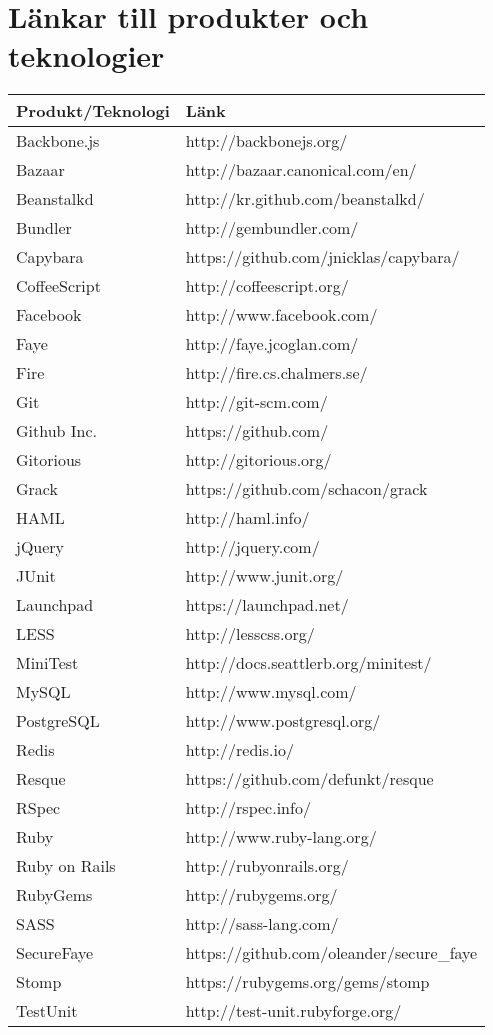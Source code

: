 \section{Länkar till produkter och teknologier}
\small
\begin{tabular} { | l | l | }
\hline
\bf{Produkt/Teknologi} & \bf{Länk} \\
\hline
Backbone.js & http://backbonejs.org/ \\
\hline
Bazaar & http://bazaar.canonical.com/en/ \\
\hline
Beanstalkd & http://kr.github.com/beanstalkd/ \\
\hline
Bundler & http://gembundler.com/ \\
\hline
Capybara & https://github.com/jnicklas/capybara/ \\
\hline 
CoffeeScript & http://coffeescript.org/ \\
\hline
Facebook & http://www.facebook.com/ \\
\hline
Faye & http://faye.jcoglan.com/ \\
\hline
Fire & http://fire.cs.chalmers.se/ \\
\hline
Git & http://git-scm.com/ \\
\hline
Github Inc. & https://github.com/ \\
\hline
Gitorious & http://gitorious.org/ \\
\hline
Grack & https://github.com/schacon/grack \\
\hline
HAML & http://haml.info/ \\
\hline
jQuery & http://jquery.com/ \\
\hline
JUnit & http://www.junit.org/ \\
\hline
Launchpad & https://launchpad.net/ \\
\hline
LESS & http://lesscss.org/ \\
\hline
MiniTest & http://docs.seattlerb.org/minitest/ \\
\hline
MySQL & http://www.mysql.com/ \\
\hline
PostgreSQL & http://www.postgresql.org/ \\
\hline
Redis & http://redis.io/ \\
\hline
Resque & https://github.com/defunkt/resque \\
\hline
RSpec & http://rspec.info/ \\
\hline
Ruby & http://www.ruby-lang.org/ \\
\hline
Ruby on Rails & http://rubyonrails.org/ \\
\hline
RubyGems & http://rubygems.org/ \\
\hline
SASS & http://sass-lang.com/ \\
\hline
SecureFaye & https://github.com/oleander/secure\_faye \\
\hline
Stomp & https://rubygems.org/gems/stomp \\
\hline
TestUnit & http://test-unit.rubyforge.org/ \\
\hline
\end{tabular}
\normalsize
